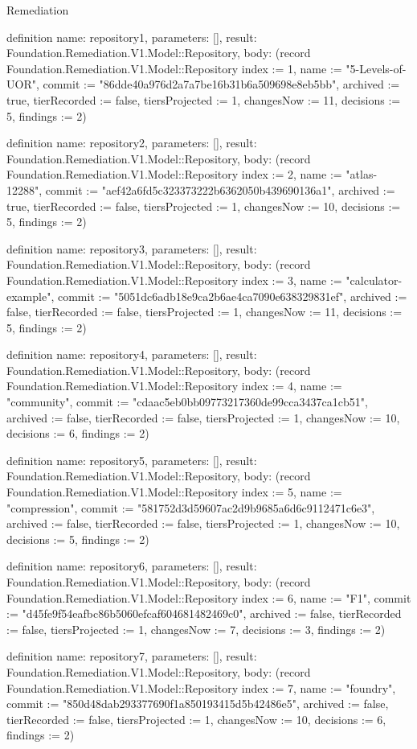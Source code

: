 \begin{lexlean}{Remediation}
\begin{semanticmodule}
definition{
  name: repository1,
  parameters: [],
  result: Foundation.Remediation.V1.Model::Repository,
  body: (record Foundation.Remediation.V1.Model::Repository {index := 1, name := "5-Levels-of-UOR", commit := "86dde40a976d2a7a7be16b31b6a509698e8eb5bb", archived := true, tierRecorded := false, tiersProjected := 1, changesNow := 11, decisions := 5, findings := 2})
}

definition{
  name: repository2,
  parameters: [],
  result: Foundation.Remediation.V1.Model::Repository,
  body: (record Foundation.Remediation.V1.Model::Repository {index := 2, name := "atlas-12288", commit := "aef42a6fd5c323373222b6362050b439690136a1", archived := true, tierRecorded := false, tiersProjected := 1, changesNow := 10, decisions := 5, findings := 2})
}

definition{
  name: repository3,
  parameters: [],
  result: Foundation.Remediation.V1.Model::Repository,
  body: (record Foundation.Remediation.V1.Model::Repository {index := 3, name := "calculator-example", commit := "5051dc6adb18e9ca2b6ae4ca7090e638329831ef", archived := false, tierRecorded := false, tiersProjected := 1, changesNow := 11, decisions := 5, findings := 2})
}

definition{
  name: repository4,
  parameters: [],
  result: Foundation.Remediation.V1.Model::Repository,
  body: (record Foundation.Remediation.V1.Model::Repository {index := 4, name := "community", commit := "cdaac5eb0bb09773217360de99cca3437ca1cb51", archived := false, tierRecorded := false, tiersProjected := 1, changesNow := 10, decisions := 6, findings := 2})
}

definition{
  name: repository5,
  parameters: [],
  result: Foundation.Remediation.V1.Model::Repository,
  body: (record Foundation.Remediation.V1.Model::Repository {index := 5, name := "compression", commit := "581752d3d59607ac2d9b9685a6d6c9112471c6e3", archived := false, tierRecorded := false, tiersProjected := 1, changesNow := 10, decisions := 5, findings := 2})
}

definition{
  name: repository6,
  parameters: [],
  result: Foundation.Remediation.V1.Model::Repository,
  body: (record Foundation.Remediation.V1.Model::Repository {index := 6, name := "F1", commit := "d45fe9f54eafbc86b5060efcaf604681482469c0", archived := false, tierRecorded := false, tiersProjected := 1, changesNow := 7, decisions := 3, findings := 2})
}

definition{
  name: repository7,
  parameters: [],
  result: Foundation.Remediation.V1.Model::Repository,
  body: (record Foundation.Remediation.V1.Model::Repository {index := 7, name := "foundry", commit := "850d48dab293377690f1a850193415d5b42486e5", archived := false, tierRecorded := false, tiersProjected := 1, changesNow := 10, decisions := 6, findings := 2})
}


\end{semanticmodule}
\end{lexlean}
